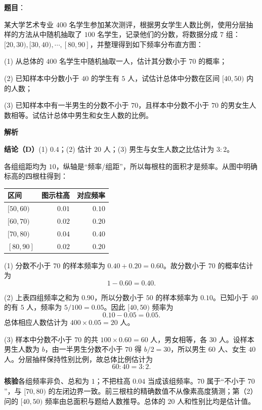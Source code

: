 \begin{answer}

\textbf{题目}：

某大学艺术专业 $400$ 名学生参加某次测评，根据男女学生人数比例，使用分层抽样的方法从中随机抽取了 $100$ 名学生，记录他们的分数，将数据分成 $7$ 组：$[20,30),\allowbreak[30,40),\allowbreak\cdots,\allowbreak[80,90]$，并整理得到如下频率分布直方图：
\nopagebreak[4]
\begin{center}\end{center}
\nopagebreak[4]
(1)   从总体的 $400$ 名学生中随机抽取一人，估计其分数小于 $70$ 的概率；

(2)   已知样本中分数小于 $40$ 的学生有 $5$ 人，试估计总体中分数在区间 $[40,50)$ 内的人数；

(3)   已知样本中有一半男生的分数不小于 $70$，且样本中分数不小于 $70$ 的男女生人数相等。试估计总体中男生和女生人数的比例。

\textbf{解析}

\textbf{结论（D）}(1) $0.4$；(2) 估计 $20$ 人；(3) 男生与女生人数之比估计为 $3:2$。

各组组距均为 $10$，纵轴是“频率/组距”，所以每根柱的面积才是频率。从图中明确标高的四根柱得到：

\begin{center}
\begin{tabular}{lrr}
\toprule
区间 & 图示柱高 & 对应频率 \\
\midrule
$[50,60)$ & $0.01$ & $0.10$ \\
$[60,70)$ & $0.02$ & $0.20$ \\
$[70,80)$ & $0.04$ & $0.40$ \\
$[80,90]$ & $0.02$ & $0.20$ \\
\bottomrule
\end{tabular}
\end{center}

(1) 分数不小于 $70$ 的样本频率为 $0.40+0.20=0.60$。故分数小于 $70$ 的概率估计为
\nopagebreak[4]
\[
1-0.60=0.40.
\]

(2) 上表四组频率之和为 $0.90$，所以分数小于 $50$ 的样本频率为 $0.10$。已知小于 $40$ 的有 $5$ 人，频率为 $5/100=0.05$。因此 $[40,50)$ 频率为
\nopagebreak[4]
\[
0.10-0.05=0.05.
\]
总体相应人数估计为 $400\times0.05=20$ 人。

(3) 样本中分数不小于 $70$ 的共 $100\times0.60=60$ 人，男女相等，各 $30$ 人。设样本男生人数为 $b$，由一半男生分数不小于 $70$ 得 $b/2=30$，所以男生 $60$ 人、女生 $40$ 人。分层抽样保持性别比例，故总体比例估计为
\nopagebreak[4]
\[
60:40=3:2.
\]

\textbf{核验}各组频率非负、总和为 $1$；不把柱高 $0.04$ 当成该组频率。$70$ 属于“不小于 $70$”，与 $[70,80)$ 的左闭边界一致。前三根柱的精确数值不从像素高度猜测；第（2）问的 $[40,50)$ 频率由总面积与题给人数推导。总体的 $20$ 人和性别比均是估计值。




\end{answer}
